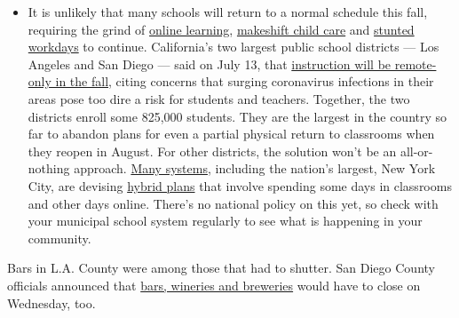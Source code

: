 \begin{itemize}
  \begin{itemize}
  \tightlist
  \item
    It is unlikely that many schools will return to a normal schedule
    this fall, requiring the grind of
    \href{https://www.nytimes3xbfgragh.onion/2020/06/05/us/coronavirus-education-lost-learning.html?action=click\&pgtype=Article\&state=default\&region=MAIN_CONTENT_3\&context=storylines_faq}{online
    learning},
    \href{https://www.nytimes3xbfgragh.onion/2020/05/29/us/coronavirus-child-care-centers.html?action=click\&pgtype=Article\&state=default\&region=MAIN_CONTENT_3\&context=storylines_faq}{makeshift
    child care} and
    \href{https://www.nytimes3xbfgragh.onion/2020/06/03/business/economy/coronavirus-working-women.html?action=click\&pgtype=Article\&state=default\&region=MAIN_CONTENT_3\&context=storylines_faq}{stunted
    workdays} to continue. California's two largest public school
    districts --- Los Angeles and San Diego --- said on July 13, that
    \href{https://www.nytimes3xbfgragh.onion/2020/07/13/us/lausd-san-diego-school-reopening.html?action=click\&pgtype=Article\&state=default\&region=MAIN_CONTENT_3\&context=storylines_faq}{instruction
    will be remote-only in the fall}, citing concerns that surging
    coronavirus infections in their areas pose too dire a risk for
    students and teachers. Together, the two districts enroll some
    825,000 students. They are the largest in the country so far to
    abandon plans for even a partial physical return to classrooms when
    they reopen in August. For other districts, the solution won't be an
    all-or-nothing approach.
    \href{https://bioethics.jhu.edu/research-and-outreach/projects/eschool-initiative/school-policy-tracker/}{Many
    systems}, including the nation's largest, New York City, are
    devising
    \href{https://www.nytimes3xbfgragh.onion/2020/06/26/us/coronavirus-schools-reopen-fall.html?action=click\&pgtype=Article\&state=default\&region=MAIN_CONTENT_3\&context=storylines_faq}{hybrid
    plans} that involve spending some days in classrooms and other days
    online. There's no national policy on this yet, so check with your
    municipal school system regularly to see what is happening in your
    community.
  \end{itemize}
\end{itemize}

Bars in L.A. County were among those that had to shutter. San Diego
County officials announced that
\href{https://www.sandiegouniontribune.com/news/health/story/2020-06-29/bars-to-close-wednesday-as-county-health-department-responds-to-local-covid-surge}{bars,
wineries and breweries} would have to close on Wednesday, too.


